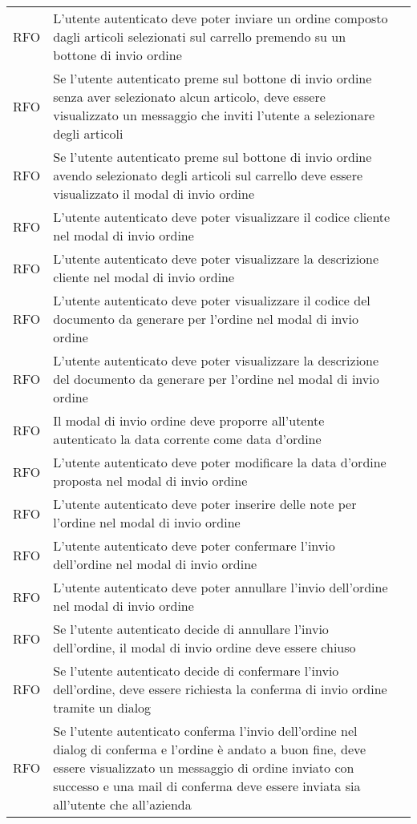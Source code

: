 \begin{table}
\begin{tabularx}{\textwidth}{lXl}
RFO & L'utente autenticato deve poter inviare un ordine composto dagli articoli selezionati sul carrello premendo su un bottone di invio ordine & \\
RFO & Se l'utente autenticato preme sul bottone di invio ordine senza aver selezionato alcun articolo, deve essere visualizzato un messaggio che inviti l'utente a selezionare degli articoli & \\
RFO & Se l'utente autenticato preme sul bottone di invio ordine avendo selezionato degli articoli sul carrello deve essere visualizzato il modal di invio ordine & \\
RFO & L'utente autenticato deve poter visualizzare il codice cliente nel modal di invio ordine & \\
RFO & L'utente autenticato deve poter visualizzare la descrizione cliente nel modal di invio ordine & \\
RFO & L'utente autenticato deve poter visualizzare il codice del documento da generare per l'ordine nel modal di invio ordine & \\
RFO & L'utente autenticato deve poter visualizzare la descrizione del documento da generare per l'ordine nel modal di invio ordine & \\
RFO & Il modal di invio ordine deve proporre all'utente autenticato la data corrente come data d'ordine & \\
RFO & L'utente autenticato deve poter modificare la data d'ordine proposta nel modal di invio ordine & \\
RFO & L'utente autenticato deve poter inserire delle note per l'ordine nel modal di invio ordine & \\
RFO & L'utente autenticato deve poter confermare l'invio dell'ordine nel modal di invio ordine & \\
RFO & L'utente autenticato deve poter annullare l'invio dell'ordine nel modal di invio ordine & \\
RFO & Se l'utente autenticato decide di annullare l'invio dell'ordine, il modal di invio ordine deve essere chiuso & \\
RFO & Se l'utente autenticato decide di confermare l'invio dell'ordine, deve essere richiesta la conferma di invio ordine tramite un dialog & \\
RFO & Se l'utente autenticato conferma l'invio dell'ordine nel dialog di conferma e l'ordine è andato a buon fine, deve essere visualizzato un messaggio di ordine inviato con successo e una mail di conferma deve essere inviata sia all'utente che all'azienda & \\

\end{tabularx}
\end{table}
